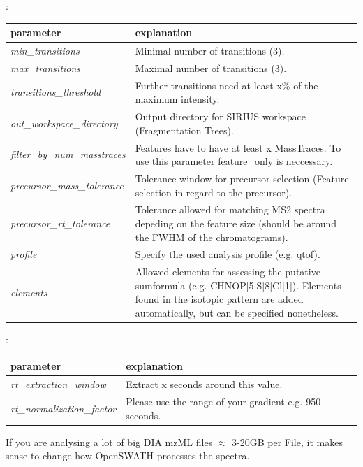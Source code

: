 \noindent{}:
\begin{center}
\begin{tabular*}{\textwidth}{ p{5.5cm}|p{10.5cm} }
\textbf{parameter} & \textbf{explanation} \\ \hline
\textit{min\_transitions} & Minimal number of transitions (3). \\
\textit{max\_transitions} &  Maximal number of transitions (3). \\
\textit{transitions\_threshold} & Further transitions need at least x\% of the maximum intensity. \\
\textit{out\_workspace\_directory} & Output directory for SIRIUS workspace (Fragmentation Trees). \\
\textit{filter\_by\_num\_masstraces} &  Features have to have at least x MassTraces. To use this parameter feature\_only is neccessary. \\
\textit{precursor\_mass\_tolerance} & Tolerance window for precursor selection (Feature selection in regard to the precursor). \\
\textit{precursor\_rt\_tolerance} & Tolerance allowed for matching MS2 spectra depeding on the feature size (should be around the FWHM of the chromatograms). \\
\textit{profile} & Specify the used analysis profile (e.g. qtof). \\
\textit{elements} & Allowed elements for assessing the putative sumformula (e.g. CHNOP[5]S[8]Cl[1]). Elements found in the isotopic pattern are added automatically, but can be specified nonetheless. \\
\end{tabular*}
\end{center}

\noindent{}:
\begin{center}
\begin{tabular*}{\textwidth}{ p{5.5cm}|p{10.5cm} }
\textbf{parameter} & \textbf{explanation} \\ \hline
\textit{rt\_extraction\_window} & Extract x seconds around this value. \\
\textit{rt\_normalization\_factor} &  Please use the range of your gradient e.g. 950 seconds. \\
\end{tabular*}
\end{center} 

\noindent If you are analysing a lot of big DIA mzML files $\approx$ 3-20GB per File, it makes sense to change how OpenSWATH processes the spectra. 

